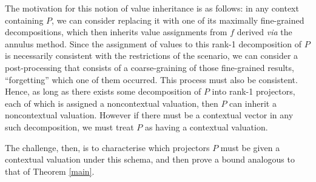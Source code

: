 \documentclass{amsart}
\theoremstyle{definition}
\begin{document}
The motivation for this notion of value inheritance is as follows: in any context containing $P$, we can consider replacing it with one of its maximally fine-grained decompositions, which then inherits value assignments from $f$ derived \emph{via} the annulus method. Since the assignment of values to this rank-1 decomposition of $P$ is necessarily consistent with the restrictions of the scenario, we can consider a post-processing that consists of a coarse-graining of those fine-grained results, ``forgetting'' which one of them occurred. This process must also be consistent. Hence, as long as there exists some decomposition of $P$ into rank-1 projectors, each of which is assigned a noncontextual valuation, then $P$ can inherit a noncontextual valuation. However if there must be a contextual vector in any such decomposition, we must treat $P$ as having a contextual valuation.

The challenge, then, is to characterise which projectors $P$ must be given a contextual valuation under this schema, and then prove a bound analogous to that of Theorem \ref{main}.
\end{document}
